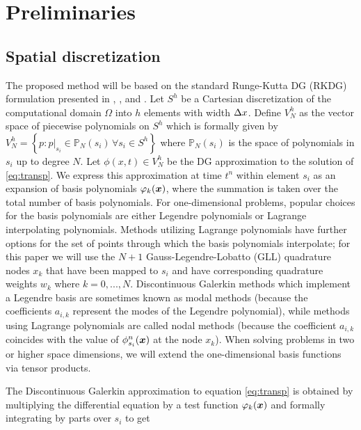 \documentclass{ametsoc}
\begin{document}
\section{Preliminaries} \label{sec:dg}
\subsection*{Spatial discretization}
The proposed method will be based on the standard Runge-Kutta DG (RKDG) formulation presented in \citet{Hesthaven:2007aa}, \citet{durran2010numerical}, and \citet{Lauritzen:2011aa}. Let $S^h$ be a Cartesian discretization of the computational domain $\Omega$ into $h$ elements with width $\Delta x$. Define $V_N^h$ as the vector space of piecewise polynomials on $S^h$ which is formally given by $V_N^h = \left\{ p : p\big|_{s_i} \in \mathbb{P}_N(s_i) \, \forall s_i \in S^h \right\}$ where $\mathbb{P}_N(s_i)$ is the space of polynomials in $s_i$ up to degree $N$. Let $\phi(x,t) \in V_N^h$ be the DG approximation to the solution of \eqref{eq:transp}. We express this approximation at time $t^n$ within element $s_i$ as an expansion of basis polynomials $\varphi_k(\boldsymbol{x})$,
where the summation is taken over the total number of basis polynomials. For one-dimensional problems, popular choices for the basis polynomials are either Legendre polynomials or Lagrange interpolating polynomials. Methods utilizing Lagrange polynomials  have further options for the set of points through which the basis polynomials interpolate; for this paper we will use the $N+1$ Gauss-Legendre-Lobatto (GLL) quadrature nodes $x_k$ that have been mapped to $s_i$ and have corresponding quadrature weights $w_k$ where $k=0,...,N$. Discontinuous Galerkin methods which implement a Legendre basis are sometimes known as modal methods (because the coefficients $a_{i,k}$ represent the modes of the Legendre polynomial), while methods using Lagrange polynomials are called nodal methods (because the coefficient $a_{i,k}$ coincides with the value of $\phi_{s_i}^n(\boldsymbol{x})$ at the node $x_k$). When solving problems in two or higher space dimensions, we will extend the one-dimensional basis functions via tensor products.

The Discontinuous Galerkin approximation to equation \eqref{eq:transp} is obtained by multiplying the differential equation by a test function $\varphi_k(\boldsymbol{x})$ and formally integrating by parts over $s_i$ to get
\end{document}
